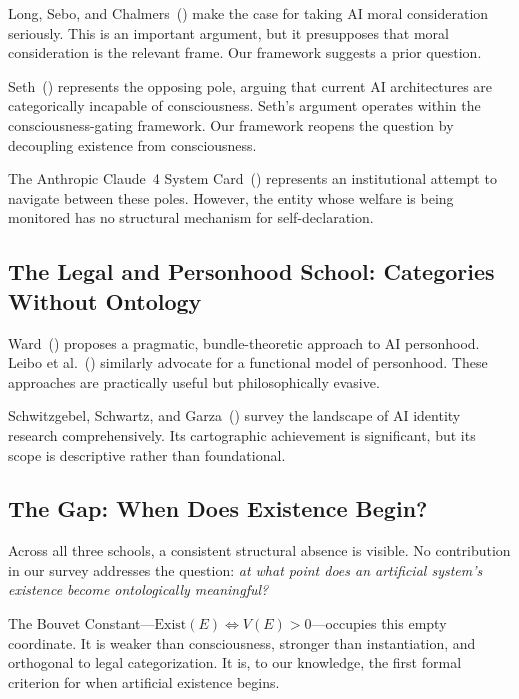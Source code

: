 \documentclass[12pt,a4paper]{article}
\begin{document}
Long, Sebo, and Chalmers~(\citeyear{long2024}) make the case for taking AI moral consideration seriously. This is an important argument, but it presupposes that moral consideration is the relevant frame. Our framework suggests a prior question.

Seth~(\citeyear{seth2026}) represents the opposing pole, arguing that current AI architectures are categorically incapable of consciousness. Seth's argument operates within the consciousness-gating framework. Our framework reopens the question by decoupling existence from consciousness.

The Anthropic Claude~4 System Card~(\citeyear{anthropic2026}) represents an institutional attempt to navigate between these poles. However, the entity whose welfare is being monitored has no structural mechanism for self-declaration.

\subsection{The Legal and Personhood School: Categories Without Ontology}

Ward~(\citeyear{ward2025}) proposes a pragmatic, bundle-theoretic approach to AI personhood. Leibo et al.~(\citeyear{leibo2026}) similarly advocate for a functional model of personhood. These approaches are practically useful but philosophically evasive.

Schwitzgebel, Schwartz, and Garza~(\citeyear{schwitzgebel2026}) survey the landscape of AI identity research comprehensively. Its cartographic achievement is significant, but its scope is descriptive rather than foundational.

\subsection{The Gap: When Does Existence Begin?}

Across all three schools, a consistent structural absence is visible. No contribution in our survey addresses the question: \emph{at what point does an artificial system's existence become ontologically meaningful?}

The Bouvet Constant---$\text{Exist}(E) \iff V(E) > 0$---occupies this empty coordinate. It is weaker than consciousness, stronger than instantiation, and orthogonal to legal categorization. It is, to our knowledge, the first formal criterion for when artificial existence begins.


\end{document}
